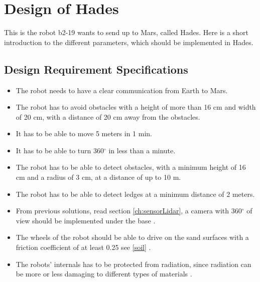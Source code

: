 \chapter{Design of Hades}
This is the robot b2-19 wants to send up to Mars, called Hades. Here is a short introduction to the different parameters, which should be implemented in Hades.

\section{Design Requirement Specifications} \label{ch:Designrequiremnts}
\begin{itemize}

    \item The robot needs to have a clear communication from Earth to Mars.
    \item The robot has to avoid  obstacles with a height of more than 16 cm and width of 20 cm, with a distance of 20 cm away from the obstacles.
    \item It has to be able to move 5 meters in 1 min.
    \item It has to be able to turn 360$^{\circ}$ in less than a minute.
    \item The robot has to be able to detect obstacles, with a minimum height of 16 cm and a radius of 3 cm, at a distance of up to 10 m.
    \item The robot has to be able to detect ledges at a minimum distance of 2 meters. 
    \item From previous solutions, read section \ref{ch:sensorLidar}, a camera with 360${^\circ}$ of view should be implemented under the base \cite{Lidar360}.
    \item The wheels of the robot should be able to drive on the sand surfaces with a friction coefficient of at least 0.25 see \ref{soil} \cite{sand}.
    \item The robots' internals has to be protected from radiation, since radiation can be more or less damaging to different types of materials \cite{radiationEffectsInMaterials}.
    

\end{itemize}
